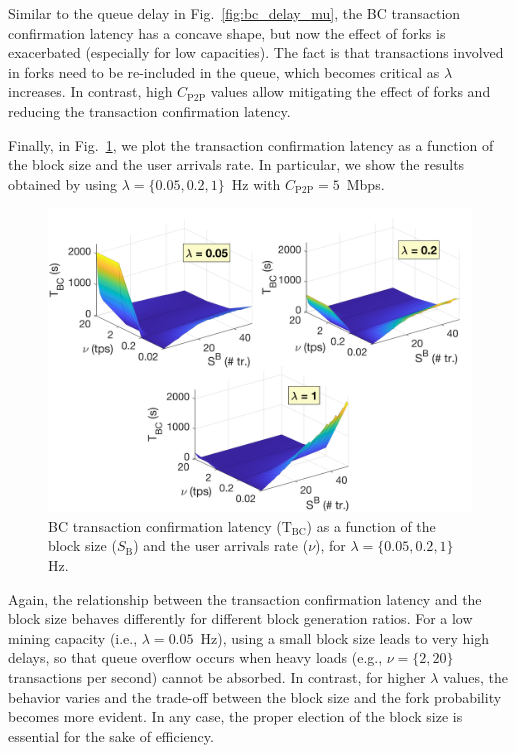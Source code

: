 \documentclass[10pt,journal,compsoc]{IEEEtran}
\begin{document}
Similar to the queue delay in Fig.~\ref{fig:bc_delay_mu}, the BC transaction confirmation latency has a concave shape, but now the effect of forks is exacerbated (especially for low capacities). The fact is that transactions involved in forks need to be re-included in the queue, which becomes critical as $\lambda$ increases. In contrast, high $C_\text{P2P}$ values allow mitigating the effect of forks and reducing the transaction confirmation latency. %

Finally, in Fig.~\ref{fig:5_delay_vs_block_size}, we plot the transaction confirmation latency as a function of the block size and the user arrivals rate. In particular, we show the results obtained by using $\lambda = \{0.05, 0.2, 1\}$~Hz with $C_\text{P2P} = 5$~Mbps.

\begin{figure}[ht!]
	\centering
	\includegraphics[width=\linewidth]{img/0_Tbc.png}
	\caption{BC transaction confirmation latency ($\text{T}_\text{BC}$) as a function of the block size ($S_\text{B}$) and the user arrivals rate ($\nu$), for $\lambda = \{0.05, 0.2, 1\}$ Hz.}
	\label{fig:5_delay_vs_block_size}
\end{figure}

Again, the relationship between the transaction confirmation latency and the block size behaves differently for different block generation ratios. For a low mining capacity (i.e., $\lambda=0.05$~Hz), using a small block size leads to very high delays, so that queue overflow occurs when heavy loads (e.g., $\nu=\{2,20\}$ transactions per second) cannot be absorbed. In contrast, for higher $\lambda$ values, the behavior varies and the trade-off between the block size and the fork probability becomes more evident. In any case, the proper election of the block size is essential for the sake of efficiency.
\end{document}
